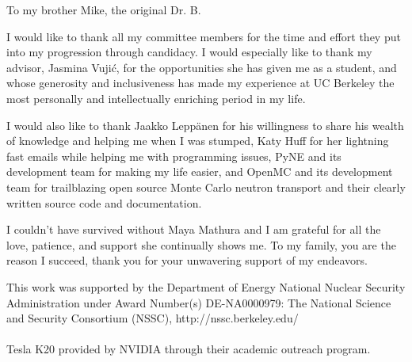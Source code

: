 \documentclass{ucbthesis}
\begin{document}
\begin{frontmatter}

\begin{dedication}
\null\vfil
\begin{center}
To my brother Mike, the original Dr. B. \\\vspace{12pt}

\end{center}
\vfil\null
\end{dedication}

\tableofcontents
\clearpage
\listoffigures
\clearpage
\listoftables

\begin{acknowledgements}

 I would like to thank all my committee members for the time and effort they put into my progression through candidacy.  I would especially like to thank my advisor, Jasmina Vuji{\'c}, for the opportunities she has given me as a student, and whose generosity and inclusiveness has made my experience at UC Berkeley the most personally and intellectually enriching period in my life. 

I would also like to thank Jaakko Lepp{\"a}nen for his willingness to share his wealth of knowledge and helping me when I was stumped, Katy Huff for her lightning fast emails while helping me with programming issues, PyNE and its development team for making my life easier, and OpenMC and its development team for trailblazing open source Monte Carlo neutron transport and their clearly written source code and documentation.	  

I couldn't have survived without Maya Mathura and I am grateful for all the love, patience, and support she continually shows me.  To my family, you are the reason I succeed, thank you for your unwavering support of my endeavors.

\vfill
\noindent This work was supported by the Department of Energy National Nuclear Security Administration under Award Number(s) DE-NA0000979: The National Science and Security Consortium (NSSC), http://nssc.berkeley.edu/
\\ \\
\noindent Tesla K20 provided by NVIDIA through their academic outreach program.

\end{acknowledgements}

\end{frontmatter}

\pagestyle{headings}

\let\originaleqref\eqref
\renewcommand{\eqref}{Eq.~\originaleqref}






\begin{appendix}


\end{appendix}

\printbibliography
\end{document}
